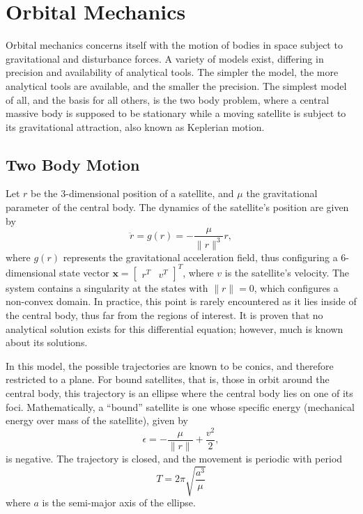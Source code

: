\section{Orbital Mechanics}

Orbital mechanics concerns itself with the motion of bodies in space subject to gravitational and disturbance forces. A variety of models exist, differing in precision and availability of analytical tools. The simpler the model, the more analytical tools are available, and the smaller the precision. The simplest model of all, and the basis for all others, is the two body problem, where a central massive body is supposed to be stationary while a moving satellite is subject to its gravitational attraction, also known as Keplerian motion. 

\subsection{Two Body Motion}

Let \(r\) be the 3-dimensional position of a satellite, and \(\mu \) the gravitational parameter of the central body. The dynamics of the satellite's position are given by~\cite{curtis2015orbital}
\begin{equation} \label{eq:kepler_dyn}
    \ddot{r} = g(r) = -\frac{\mu}{\lVert r \rVert^3} r,
\end{equation}
where \(g(r)\) represents the gravitational acceleration field, thus configuring a 6-dimensional state vector \(\mathbf{x} = \begin{bmatrix}
    r^T & v^T
\end{bmatrix}^T\), where \(v\) is the satellite's velocity. The system contains a singularity at the states with \(\lVert r \rVert = 0\), which configures a non-convex domain. In practice, this point is rarely encountered as it lies inside of the central body, thus far from the regions of interest. It is proven that no analytical solution exists for this differential equation; however, much is known about its solutions.

In this model, the possible trajectories are known to be conics, and therefore restricted to a plane. For bound satellites, that is, those in orbit around the central body, this trajectory is an ellipse where the central body lies on one of its foci. Mathematically, a ``bound'' satellite is one whose specific energy (mechanical energy over mass of the satellite), given by~\cite{curtis2015orbital}
\begin{equation}
    \epsilon = -\frac{\mu}{\lVert r \rVert} + \frac{v^2}{2},
\end{equation}
is negative. The trajectory is closed, and the movement is periodic with period~\cite{curtis2015orbital}
\begin{equation}
    T = 2\pi \sqrt{\frac{a^3}{\mu}}
\end{equation}
where \(a\) is the semi-major axis of the ellipse.

